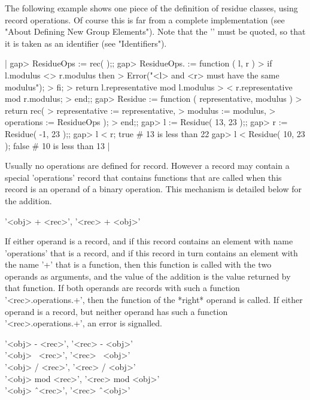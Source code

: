 The  following example shows  one   piece  of the  definition of  residue
classes, using record operations.  Of course this is far from  a complete
implementation (see "About Defining New Group  Elements").  Note that the
'\<' must   be quoted,  so that  it   is  taken as   an  identifier  (see
"Identifiers").

|    gap> ResidueOps := rec( );;
    gap> ResidueOps.\< := function ( l, r )
    >   if l.modulus <> r.modulus  then
    >     Error("<l> and <r> must have the same modulus");
    >   fi;
    >   return   l.representative mod l.modulus
    >          < r.representative mod r.modulus;
    > end;;
    gap> Residue := function ( representative, modulus )
    >   return rec(
    >     representative := representative,
    >     modulus        := modulus,
    >     operations     := ResidueOps );
    > end;;
    gap> l := Residue( 13, 23 );;
    gap> r := Residue( -1, 23 );;
    gap> l < r;
    true    # 13 is less than 22
    gap> l < Residue( 10, 23 );
    false    # 10 is less than 13 |

%
%
%

Usually no  operations are defined   for  record.  However  a record  may
contain  a special 'operations'  record  that contains functions that are
called when this  record  is an   operand  of a binary  operation.   This
mechanism is detailed below for the addition.

'<obj> + <rec>', '<rec> + <obj>'

If either operand  is a record, and  if  this record  contains an element
with  name 'operations' that  is  a record, and   if this record  in turn
contains an element  with  the name '+'  that  is  a function,  then this
function is called with the two operands as  arguments, and the  value of
the  addition is the value returned  by that  function.  If both operands
are records with such a function '<rec>.operations.+', then  the function
of the *right* operand is  called.  If either  operand  is a record,  but
neither  operand has such  a function  '<rec>.operations.+',  an error is
signalled.

'<obj>  -  <rec>', '<rec>  -  <obj>' \\
'<obj> \*\ <rec>', '<rec> \*\ <obj>' \\
'<obj>  /  <rec>', '<rec>  /  <obj>' \\
'<obj> mod <rec>', '<rec> mod <obj>' \\
'<obj> \^\ <rec>', '<rec> \^\ <obj>'

